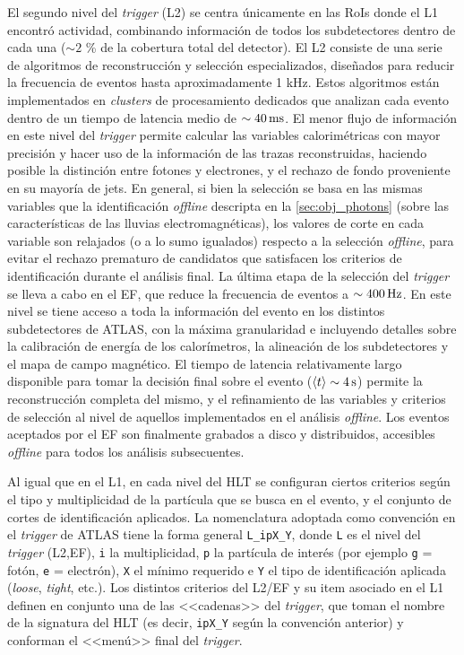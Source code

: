 El segundo nivel del \emph{trigger} (L2) se centra únicamente en las RoIs donde el L1
encontró actividad, combinando información de todos los subdetectores dentro de
cada una ($\sim 2$ \% de la cobertura total del detector). El L2 consiste de una
serie de algoritmos de reconstrucción y selección especializados, dise\~nados
para reducir la frecuencia de eventos hasta aproximadamente 1 kHz. Estos
algoritmos están implementados en \emph{clusters} de procesamiento dedicados
que analizan cada evento dentro de un tiempo de latencia medio de $\sim
\unit[40]{ms}$. El menor flujo de información en este nivel del \emph{trigger} permite
calcular las variables calorimétricas con mayor precisión y hacer uso de la
información de las trazas reconstruidas, haciendo posible la distinción entre
fotones y electrones, y el rechazo de fondo proveniente en su mayoría de jets.
En general, si bien la selección se basa en las mismas variables que la
identificación \emph{offline} descripta en la \cref{sec:obj_photons} (sobre las características de
las lluvias electromagnéticas), los valores de corte en cada variable son
relajados (o a lo sumo igualados) respecto a la selección \emph{offline}, para evitar
el rechazo prematuro de candidatos que satisfacen los criterios de identificación
durante el análisis final. La última etapa de la selección del \emph{trigger} se lleva
a cabo en el EF, que reduce la frecuencia de eventos a $\sim \unit[400]{Hz}$.
En este nivel se tiene acceso a toda
la información del evento en los distintos subdetectores de ATLAS, con la máxima
granularidad e incluyendo detalles sobre la calibración de energía de los
calorímetros, la alineación de los subdetectores y el mapa de campo magnético. El
tiempo de latencia relativamente largo disponible para tomar la decisión final
sobre el evento ($\avg{t} \sim \unit[4]{s}$) permite la reconstrucción completa
del mismo, y el refinamiento de las variables y criterios de selección al nivel
de aquellos implementados en el análisis \emph{offline}. Los eventos aceptados por el
EF son finalmente grabados a disco y distribuidos, accesibles \emph{offline} para todos
los análisis subsecuentes.

Al igual que en el L1, en cada nivel del HLT se configuran ciertos
criterios según el tipo y multiplicidad de la partícula que se busca en el
evento, y el conjunto de cortes de identificación aplicados. La nomenclatura
adoptada como convención en el \emph{trigger} de ATLAS tiene la forma general
\texttt{L\_ipX\_Y}, donde \texttt{L} es el nivel del \emph{trigger} (L2,EF), \texttt{i}
la multiplicidad, \texttt{p} la partícula de interés (por ejemplo
\texttt{g} = fotón, \texttt{e} = electrón), \texttt{X} el {\pt} mínimo requerido e
\texttt{Y} el tipo de identificación aplicada (\emph{loose}, \emph{tight}, etc.). Los
distintos criterios del L2/EF y su item asociado en el L1 definen en conjunto
una de las <<cadenas>> del \emph{trigger}, que toman el nombre de la signatura del
HLT (es decir, \texttt{ipX\_Y} según la convención anterior) y conforman el <<menú>> final
del \emph{trigger}.

